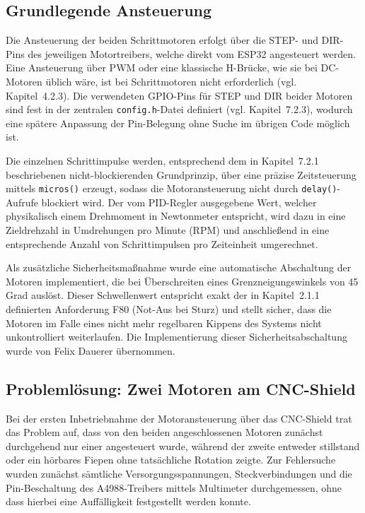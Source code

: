 \documentclass[12pt,ngerman,numbers=noenddot,abstracton,headsepline]{scrreprt}
\begin{document}
\subsection{Grundlegende Ansteuerung}
\label{subsec:motor_grundansteuerung}

Die Ansteuerung der beiden Schrittmotoren erfolgt über die STEP- und DIR-Pins des jeweiligen Motortreibers, welche direkt vom ESP32 angesteuert werden. Eine Ansteuerung über PWM oder eine klassische H-Brücke, wie sie bei DC-Motoren üblich wäre, ist bei Schrittmotoren nicht erforderlich (vgl. Kapitel~4.2.3). Die verwendeten GPIO-Pins für STEP und DIR beider Motoren sind fest in der zentralen \texttt{config.h}-Datei definiert (vgl. Kapitel~7.2.3), wodurch eine spätere Anpassung der Pin-Belegung ohne Suche im übrigen Code möglich ist.

Die einzelnen Schrittimpulse werden, entsprechend dem in Kapitel~7.2.1 beschriebenen nicht-blockierenden Grundprinzip, über eine präzise Zeitsteuerung mittels \texttt{micros()} erzeugt, sodass die Motoransteuerung nicht durch \texttt{delay()}-Aufrufe blockiert wird. Der vom PID-Regler ausgegebene Wert, welcher physikalisch einem Drehmoment in Newtonmeter entspricht, wird dazu in eine Zieldrehzahl in Umdrehungen pro Minute (RPM) und anschließend in eine entsprechende Anzahl von Schrittimpulsen pro Zeiteinheit umgerechnet.

Als zusätzliche Sicherheitsmaßnahme wurde eine automatische Abschaltung der Motoren implementiert, die bei Überschreiten eines Grenzneigungswinkels von 45\,Grad auslöst. Dieser Schwellenwert entspricht exakt der in Kapitel~2.1.1 definierten Anforderung F80 (Not-Aus bei Sturz) und stellt sicher, dass die Motoren im Falle eines nicht mehr regelbaren Kippens des Systems nicht unkontrolliert weiterlaufen. Die Implementierung dieser Sicherheitsabschaltung wurde von Felix Dauerer übernommen.

\subsection{Problemlösung: Zwei Motoren am CNC-Shield}
\label{subsec:motor_problem_cncshield}

Bei der ersten Inbetriebnahme der Motoransteuerung über das CNC-Shield trat das Problem auf, dass von den beiden angeschlossenen Motoren zunächst durchgehend nur einer angesteuert wurde, während der zweite entweder stillstand oder ein hörbares Fiepen ohne tatsächliche Rotation zeigte. Zur Fehlersuche wurden zunächst sämtliche Versorgungsspannungen, Steckverbindungen und die Pin-Beschaltung des A4988-Treibers mittels Multimeter durchgemessen, ohne dass hierbei eine Auffälligkeit festgestellt werden konnte.
\end{document}
